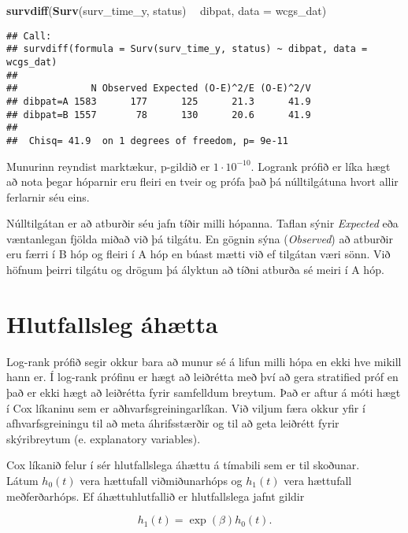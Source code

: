 \documentclass[
]{book}
\newenvironment{Shaded}{\begin{snugshade}}{\end{snugshade}}
\newcommand{\DataTypeTok}[1]{\textcolor[rgb]{0.13,0.29,0.53}{#1}}
\newcommand{\KeywordTok}[1]{\textcolor[rgb]{0.13,0.29,0.53}{\textbf{#1}}}
\newcommand{\NormalTok}[1]{#1}
\newcommand{\OperatorTok}[1]{\textcolor[rgb]{0.81,0.36,0.00}{\textbf{#1}}}
\newcommand{\StringTok}[1]{\textcolor[rgb]{0.31,0.60,0.02}{#1}}
\begin{document}
\begin{Shaded}
\begin{Highlighting}[]
\KeywordTok{survdiff}\NormalTok{(}\KeywordTok{Surv}\NormalTok{(surv_time_y, status) }\OperatorTok{~}\StringTok{ }\NormalTok{dibpat, }\DataTypeTok{data =}\NormalTok{ wcgs_dat)}
\end{Highlighting}
\end{Shaded}

\begin{verbatim}
## Call:
## survdiff(formula = Surv(surv_time_y, status) ~ dibpat, data = wcgs_dat)
## 
##             N Observed Expected (O-E)^2/E (O-E)^2/V
## dibpat=A 1583      177      125      21.3      41.9
## dibpat=B 1557       78      130      20.6      41.9
## 
##  Chisq= 41.9  on 1 degrees of freedom, p= 9e-11
\end{verbatim}

Munurinn reyndist marktækur, p-gildið er \(1 \cdot 10^{-10}\). Logrank prófið er líka hægt að nota þegar hóparnir eru fleiri en tveir og prófa það þá núlltilgátuna hvort allir ferlarnir séu eins.

Núlltilgátan er að atburðir séu jafn tíðir milli hópanna. Taflan sýnir \emph{Expected} eða væntanlegan fjölda miðað við þá tilgátu. En gögnin sýna (\emph{Observed}) að atburðir eru færri í B hóp og fleiri í A hóp en búast mætti við ef tilgátan væri sönn. Við höfnum þeirri tilgátu og drögum þá ályktun að tíðni atburða sé meiri í A hóp.

\hypertarget{prof_haz}{%
\chapter{Hlutfallsleg áhætta}\label{prof_haz}}

Log-rank prófið segir okkur bara að munur sé á lifun milli hópa en ekki hve mikill hann er. Í log-rank prófinu er hægt að leiðrétta með því að gera stratified próf en það er ekki hægt að leiðrétta fyrir samfelldum breytum. Það er aftur á móti hægt í Cox líkaninu sem er aðhvarfsgreiningarlíkan. Við viljum færa okkur yfir í afhvarfsgreiningu til að meta áhrifsstærðir og til að geta leiðrétt fyrir skýribreytum (e. explanatory variables).

Cox líkanið felur í sér hlutfallslega áhættu á tímabili sem er til skoðunar.\\
Látum \(h_0(t)\) vera hættufall viðmiðunarhóps og \(h_1(t)\) vera hættufall meðferðarhóps. Ef áhættuhlutfallið er hlutfallslega jafnt gildir

\[
h_1(t) = \exp(\beta)h_0(t).
\]
\end{document}
